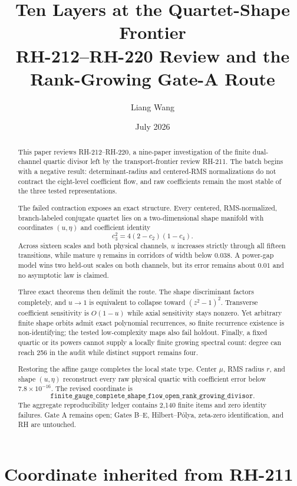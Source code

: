 \documentclass[12pt]{article}
\title{Ten Layers at the Quartet-Shape Frontier\\
\large RH-212--RH-220 Review and the Rank-Growing Gate-A Route}
\author{Liang Wang}\date{July 2026}
\theoremstyle{remark}\newtheorem{remark}[theorem]{Remark}
\begin{document}
\maketitle
\begin{abstract}
This paper reviews RH-212--RH-220, a nine-paper investigation of the finite
dual-channel quartic divisor left by the transport-frontier review RH-211.
The batch begins with a negative result: determinant-radius and centered-RMS
normalizations do not contract the eight-level coefficient flow, and raw
coefficients remain the most stable of the three tested representations.

The failed contraction exposes an exact structure.  Every centered,
RMS-normalized, branch-labeled conjugate quartet lies on a two-dimensional
shape manifold with coordinates $(u,\eta)$ and coefficient identity
\[
 c_3^2=4(2-c_2)(1-c_4).
\]
Across sixteen scales and both physical channels, $u$ increases strictly
through all fifteen transitions, while mature $\eta$ remains in corridors of
width below $0.038$.  A power-gap model wins two held-out scales on both
channels, but its error remains about $0.01$ and no asymptotic law is claimed.

Three exact theorems then delimit the route.  The shape discriminant factors
completely, and $u\to1$ is equivalent to collapse toward $(z^2-1)^2$.
Transverse coefficient sensitivity is $O(1-u)$ while axial sensitivity stays
nonzero.  Yet arbitrary finite shape orbits admit exact polynomial
recurrences, so finite recurrence existence is non-identifying; the tested
low-complexity maps also fail holdout.  Finally, a fixed quartic or its powers
cannot supply a locally finite growing spectral count: degree can reach 256
in the audit while distinct support remains four.

Restoring the affine gauge completes the local state type.  Center $\mu$,
RMS radius $r$, and shape $(u,\eta)$ reconstruct every raw physical quartic
with coefficient error below $7.8\times10^{-16}$.  The revised coordinate is
\[
\texttt{finite\_gauge\_complete\_shape\_flow\_open\_rank\_growing\_divisor}.
\]
The aggregate reproducibility ledger contains 2,140 finite items and zero
identity failures.  Gate A remains open; Gates B--E, Hilbert--P\'olya,
zeta-zero identification, and RH are untouched.
\end{abstract}

\section{Coordinate inherited from RH-211}
\end{document}
